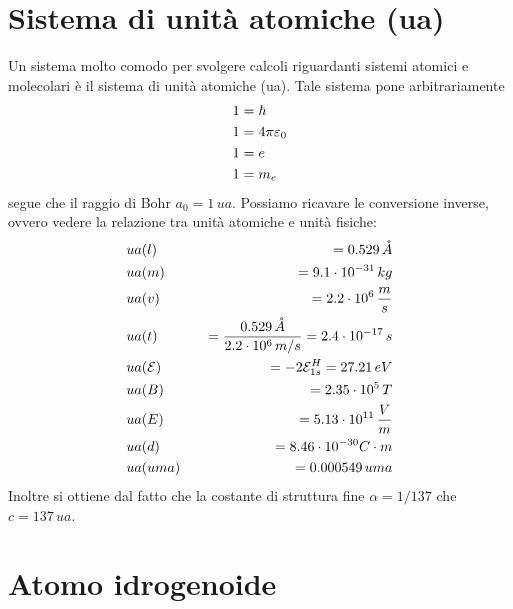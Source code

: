 \documentclass{article}
\begin{document}
\section*{Sistema di unità atomiche (ua)}
Un sistema molto comodo per svolgere calcoli riguardanti sistemi atomici e molecolari è il sistema di unità atomiche (ua). Tale sistema pone arbitrariamente
\begin{align}
    1 &= \hbar \notag \\
    1 &= 4\pi\varepsilon_0 \notag \\
    1 &= e \notag \\
    1 &= m_e \notag
\end{align}
segue che il raggio di Bohr $a_0 = 1 \, ua$. Possiamo ricavare le conversione inverse, ovvero vedere la relazione tra unità atomiche e unità fisiche:
\begin{align}
    &ua(l) \quad &= 0.529 \, \mathring{A} \notag \\
    &ua(m) \quad &= 9.1 \cdot 10^{-31} \, kg \notag \\
    &ua(v) \quad &= 2.2 \cdot 10^6 \, \frac{m}{s} \notag \\
    &ua(t) \quad &= \frac{0.529 \, \mathring{A}}{2.2 \cdot 10^6 \, m/s} = 2.4 \cdot 10^{-17} \, s \notag \\
    &ua(\mathcal{E}) \quad &= -2\mathcal{E}^H_{1s} = 27.21 \, eV \notag \\
    &ua(B) \quad &= 2.35 \cdot 10^5 \, T \notag \\
    &ua(E) \quad &= 5.13 \cdot 10^{11} \, \frac{V}{m} \notag \\
    &ua(d) \quad &= 8.46 \cdot 10^{-30} C \cdot m \notag \\
    &ua(uma) \quad &= 0.000549 \, uma \notag
\end{align}
Inoltre si ottiene dal fatto che la costante di struttura fine $\alpha = 1/137$ che $c = 137 \, ua$.

\newpage
\section{Atomo idrogenoide}
\end{document}
